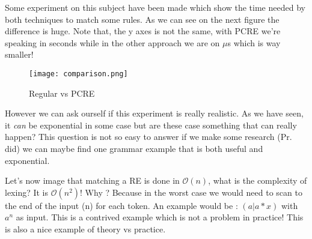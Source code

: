     \newpage
    Some experiment on this subject have been made which show the time needed by
    both techniques to match some rules. As we can see on the next figure the
    difference is huge. Note that, the y axes is not the same, with PCRE we're
    speaking in seconds while in the other approach we are on $\mu$s which is
    way smaller!
    \begin{figure}[H]
         \centering
         \texttt{[image: comparison.png]}
         \caption{Regular vs PCRE}
         \label{fig:regu_vs_pcre}
    \end{figure}

    However we can ask ourself if this experiment is really realistic. As we
    have seen, it \textit{can} be exponential in some case but are these case
    something that can really happen? This question is not so easy to answer if
    we make some research (Pr. did) we can maybe find one grammar example that
    is both useful and exponential.

    Let's now image that matching a RE is done in $\mathcal{O}(n)$, what is the
    complexity of lexing? It is $\mathcal{O}(n^2)$! Why ? Because in the worst
    case we would need to scan to the end of the input (n) for each token. An
    example would be : $(a | a*x)$ with $a^n$ as input. This is a contrived
    example which is not a problem in practice! This is also a nice example of
    theory vs practice.